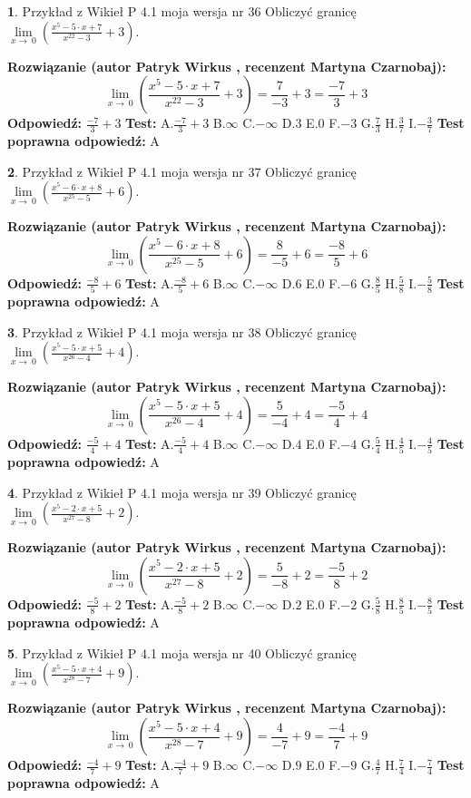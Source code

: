 \documentclass[12pt, a4paper]{article}
\theoremstyle{definition} %
\newtheorem{zad}{}
\newcommand{\zadStart}[1]{\begin{zad}#1\newline}
\newcommand{\zadStop}{\end{zad}}
\newcommand{\rozwStart}[2]{\noindent \textbf{Rozwiązanie (autor #1 , recenzent #2): }\newline}
\newcommand{\rozwStop}{\newline}
\newcommand{\odpStart}{\noindent \textbf{Odpowiedź:}\newline}
\newcommand{\odpStop}{\newline}
\newcommand{\testStart}{\noindent \textbf{Test:}\newline}
\newcommand{\testStop}{\newline}
\newcommand{\kluczStart}{\noindent \textbf{Test poprawna odpowiedź:}\newline}
\newcommand{\kluczStop}{\newline}
\begin{document}
\zadStart{Przykład z Wikieł P 4.1 moja wersja nr 36}
Obliczyć granicę $\lim\limits_{x\to\ 0}(\frac{x^{5}-5 \cdot x +7}{x^{22}-3}+3)$.
\zadStop
\rozwStart{Patryk Wirkus}{Martyna Czarnobaj}
$$\lim\limits_{x\to\ 0}(\frac{x^{5}-5 \cdot x +7}{x^{22}-3}+3)=\frac{7}{-3}+3=\frac{-7}{3}+3$$
\rozwStop
\odpStart
$\frac{-7}{3}+3$
\odpStop
\testStart
A.$\frac{-7}{3}+3$
B.$\infty$
C.$-\infty$
D.$3$
E.$0$
F.$-3$
G.$\frac{7}{3}$
H.$\frac{3}{7}$
I.$-\frac{3}{7}$
\testStop
\kluczStart
A
\kluczStop



\zadStart{Przykład z Wikieł P 4.1 moja wersja nr 37}
Obliczyć granicę $\lim\limits_{x\to\ 0}(\frac{x^{5}-6 \cdot x +8}{x^{25}-5}+6)$.
\zadStop
\rozwStart{Patryk Wirkus}{Martyna Czarnobaj}
$$\lim\limits_{x\to\ 0}(\frac{x^{5}-6 \cdot x +8}{x^{25}-5}+6)=\frac{8}{-5}+6=\frac{-8}{5}+6$$
\rozwStop
\odpStart
$\frac{-8}{5}+6$
\odpStop
\testStart
A.$\frac{-8}{5}+6$
B.$\infty$
C.$-\infty$
D.$6$
E.$0$
F.$-6$
G.$\frac{8}{5}$
H.$\frac{5}{8}$
I.$-\frac{5}{8}$
\testStop
\kluczStart
A
\kluczStop



\zadStart{Przykład z Wikieł P 4.1 moja wersja nr 38}
Obliczyć granicę $\lim\limits_{x\to\ 0}(\frac{x^{5}-5 \cdot x +5}{x^{26}-4}+4)$.
\zadStop
\rozwStart{Patryk Wirkus}{Martyna Czarnobaj}
$$\lim\limits_{x\to\ 0}(\frac{x^{5}-5 \cdot x +5}{x^{26}-4}+4)=\frac{5}{-4}+4=\frac{-5}{4}+4$$
\rozwStop
\odpStart
$\frac{-5}{4}+4$
\odpStop
\testStart
A.$\frac{-5}{4}+4$
B.$\infty$
C.$-\infty$
D.$4$
E.$0$
F.$-4$
G.$\frac{5}{4}$
H.$\frac{4}{5}$
I.$-\frac{4}{5}$
\testStop
\kluczStart
A
\kluczStop



\zadStart{Przykład z Wikieł P 4.1 moja wersja nr 39}
Obliczyć granicę $\lim\limits_{x\to\ 0}(\frac{x^{5}-2 \cdot x +5}{x^{27}-8}+2)$.
\zadStop
\rozwStart{Patryk Wirkus}{Martyna Czarnobaj}
$$\lim\limits_{x\to\ 0}(\frac{x^{5}-2 \cdot x +5}{x^{27}-8}+2)=\frac{5}{-8}+2=\frac{-5}{8}+2$$
\rozwStop
\odpStart
$\frac{-5}{8}+2$
\odpStop
\testStart
A.$\frac{-5}{8}+2$
B.$\infty$
C.$-\infty$
D.$2$
E.$0$
F.$-2$
G.$\frac{5}{8}$
H.$\frac{8}{5}$
I.$-\frac{8}{5}$
\testStop
\kluczStart
A
\kluczStop



\zadStart{Przykład z Wikieł P 4.1 moja wersja nr 40}
Obliczyć granicę $\lim\limits_{x\to\ 0}(\frac{x^{5}-5 \cdot x +4}{x^{28}-7}+9)$.
\zadStop
\rozwStart{Patryk Wirkus}{Martyna Czarnobaj}
$$\lim\limits_{x\to\ 0}(\frac{x^{5}-5 \cdot x +4}{x^{28}-7}+9)=\frac{4}{-7}+9=\frac{-4}{7}+9$$
\rozwStop
\odpStart
$\frac{-4}{7}+9$
\odpStop
\testStart
A.$\frac{-4}{7}+9$
B.$\infty$
C.$-\infty$
D.$9$
E.$0$
F.$-9$
G.$\frac{4}{7}$
H.$\frac{7}{4}$
I.$-\frac{7}{4}$
\testStop
\kluczStart
A
\kluczStop
\end{document}
